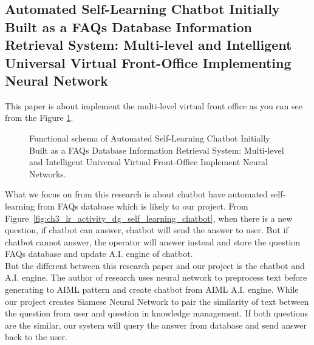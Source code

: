 \documentclass[12pt,oneside,openright,a4paper]{cpe-english-project}
\begin{document}
\subsection{Automated Self-Learning Chatbot Initially Built as a FAQs Database Information Retrieval
System: Multi-level and Intelligent Universal Virtual Front-Office Implementing Neural Network}
This paper is about implement the multi-level virtual front office as you can see from the Figure
\ref*{fig:ch3_lr_self_learning_chatbot}. 
\begin{figure}[h!]
  \centering
  \setlength{\fboxrule}{0.2mm}
  \setlength{\fboxsep}{0.5cm}
  \caption{Functional schema of Automated Self-Learning Chatbot Initially Built as a FAQs
  Database Information Retrieval System: Multi-level and Intelligent Universal Virtual
  Front-Office Implement Neural Networks.}
  \label{fig:ch3_lr_self_learning_chatbot}
\end{figure}

What we focus on from this research is about chatbot have automated self-learning from FAQs
database which is likely to our project. From Figure~\ref*{fig:ch3_lr_activity_dg_self_learning_chatbot},
when there is a new question, if chatbot can answer, chatbot will send the answer to user.
But if chatbot cannot answer, the operator will answer instead and store the question FAQs
database and update A.I. engine of chatbot.\\
But the different between this research paper and our project is the chatbot and A.I. engine.
The author of research uses neural network to preprocess text before generating to AIML
pattern and create chatbot from AIML A.I. engine. While our project creates Siamese Neural
Network to pair the similarity of text between the question from user and question in
knowledge management. If both questions are the similar, our system will query the answer
from database and send answer back to the user.
\end{document}
